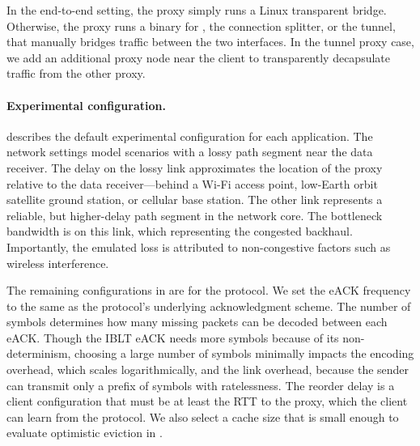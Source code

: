 In the end-to-end setting, the proxy simply runs a Linux transparent bridge.
Otherwise, the
proxy runs a binary for \Sys, the connection splitter, or the tunnel, that
manually bridges traffic between the two interfaces.
In the tunnel proxy case, we add an additional proxy
node near the client to transparently decapsulate traffic from the other
proxy.



\paragraph{Experimental configuration.}

 describes the default experimental configuration
for each application. The network settings model scenarios with a lossy path
segment near the data receiver. The delay on the lossy link approximates the
location of the proxy relative to the data receiver---behind a Wi-Fi access
point, low-Earth orbit satellite ground station, or cellular base station.
The other link represents a reliable, but higher-delay path segment in the
network core. The bottleneck bandwidth is on this link, which
representing the congested backhaul. Importantly, the emulated loss is
attributed to non-congestive factors such as wireless interference.



The remaining configurations in  are for the \Sys
protocol. We set the eACK frequency to the same as the protocol's underlying
acknowledgment scheme. The number of symbols determines how many missing
packets can be decoded between each eACK. Though the IBLT eACK needs more symbols
because of its non-determinism, choosing a large number of symbols minimally
impacts the encoding overhead, which scales logarithmically, and the link
overhead, because the sender can transmit only a prefix of symbols
with ratelessness.
The reorder delay is a client configuration that
must be at least the RTT to the proxy, which the client can learn from the \Sys
protocol. We also select a cache size that is small enough to evaluate
optimistic eviction in .

